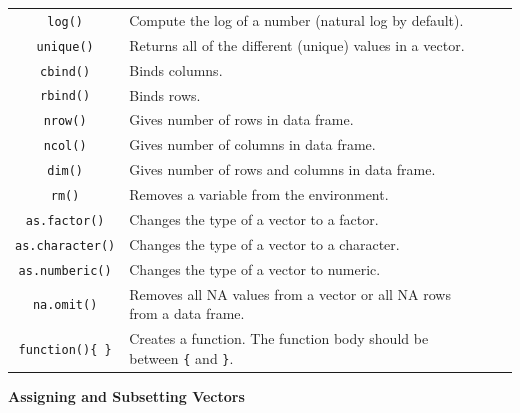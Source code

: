 \documentclass[11pt]{article}
\begin{document}
\begin{longtable}{clcc}
	\texttt{log()} & Compute the log of a number (natural log by default).\\
	\texttt{unique()} & Returns all of the different (unique) values in a vector. \\
	\texttt{cbind()} & Binds columns.\\
	\texttt{rbind()} & Binds rows.\\
	\texttt{nrow()} & Gives number of rows in data frame.\\
	\texttt{ncol()} & Gives number of columns in data frame.\\
	\texttt{dim()} & Gives number of rows and columns in data frame.\\
	\texttt{rm()} & Removes a variable from the environment.\\
	\texttt{as.factor()} & Changes the type of a vector to a factor.\\
	\texttt{as.character()} & Changes the type of a vector to a character.\\
	\texttt{as.numberic()} & Changes the type of a vector to numeric.\\
	\texttt{na.omit()} & Removes all NA values from a vector or all NA rows from a data frame.\\
	\texttt{function()\{ \}} & Creates a function. The function body should be between \texttt{\{} and \texttt{\}}.
\end{longtable}


\begin{tcolorbox}[width=3.2in, sharp corners=all, colback=white!95!black] %
	{\bf Assigning and Subsetting Vectors}
\end{tcolorbox}
\end{document}
